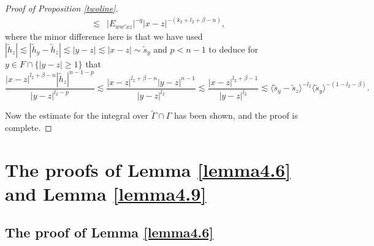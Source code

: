 \documentclass[11pt,reqno]{amsart}
\numberwithin{equation}{section}
\theoremstyle{definition}
\begin{document}
\begin{appendix}
\begin{proof}[Proof of Proposition \ref{twoline}]
\begin{equation*}
\begin{split}
				\lesssim&|E_{ww'xz}|^{-q}|x-z|^{-(k_2+l_2+\beta-n)},
			\end{split}
		\end{equation*}
		where the minor difference here is that we have used $|\tilde{h}_z|\lesssim|\tilde{h}_y-\tilde{h}_z|\lesssim|y-z|\lesssim|x-z|\sim\tilde{s}_y$ and $p<n-1$ to deduce for $y\in F\cap\{|y-z|\geq1\}$ that
		\begin{equation*}
			\frac{|x-z|^{l_2+\beta-n}|\tilde{h}_z|^{n-1-p}}{|y-z|^{l_2-p}}\lesssim\frac{|x-z|^{l_2+\beta-n}|y-z|^{n-1}}{|y-z|^{l_2}}\lesssim\frac{|x-z|^{l_2+\beta-1}}{|y-z|^{l_2}}\lesssim\langle\tilde{s}_y-\tilde{s}_z\rangle^{-l_2}\langle\tilde{s}_y\rangle^{-(1-l_2-\beta)}.
		\end{equation*}
		
		Now the estimate for the integral over $\tilde{\Gamma}\cap\Gamma$ has been shown, and the proof is complete.
	\end{proof}
	
	\section{The proofs of Lemma \ref{lemma4.6} and Lemma \ref{lemma4.9} }\label{app-002}
	
	\subsection{The proof of Lemma \ref{lemma4.6}}\
	

\end{appendix}
\end{document}
